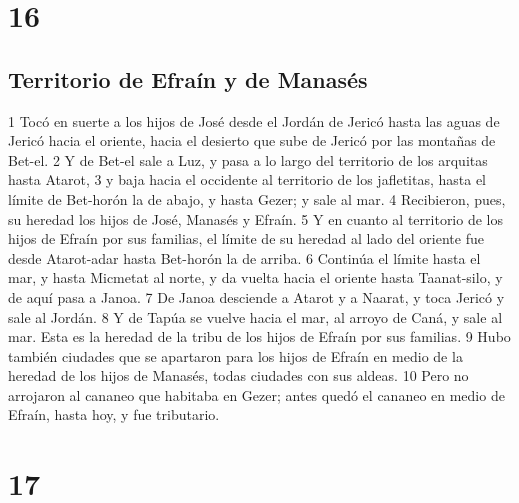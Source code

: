 \chapter{16}

\section*{Territorio de Efraín y de Manasés}


1 Tocó en suerte a los hijos de José desde el Jordán de Jericó hasta las aguas de Jericó hacia el oriente, hacia el desierto que sube de Jericó por las montañas de Bet-el.
2 Y de Bet-el sale a Luz, y pasa a lo largo del territorio de los arquitas hasta Atarot,
3 y baja hacia el occidente al territorio de los jafletitas, hasta el límite de Bet-horón la de abajo, y hasta Gezer; y sale al mar.
4 Recibieron, pues, su heredad los hijos de José, Manasés y Efraín.
5 Y en cuanto al territorio de los hijos de Efraín por sus familias, el límite de su heredad al lado del oriente fue desde Atarot-adar hasta Bet-horón la de arriba.
6 Continúa el límite hasta el mar, y hasta Micmetat al norte, y da vuelta hacia el oriente hasta Taanat-silo, y de aquí pasa a Janoa.
7 De Janoa desciende a Atarot y a Naarat, y toca Jericó y sale al Jordán.
8 Y de Tapúa se vuelve hacia el mar, al arroyo de Caná, y sale al mar. Esta es la heredad de la tribu de los hijos de Efraín por sus familias.
9 Hubo también ciudades que se apartaron para los hijos de Efraín en medio de la heredad de los hijos de Manasés, todas ciudades con sus aldeas.
10 Pero no arrojaron al cananeo que habitaba en Gezer; antes quedó el cananeo en medio de Efraín, hasta hoy, y fue tributario.

\chapter{17}


